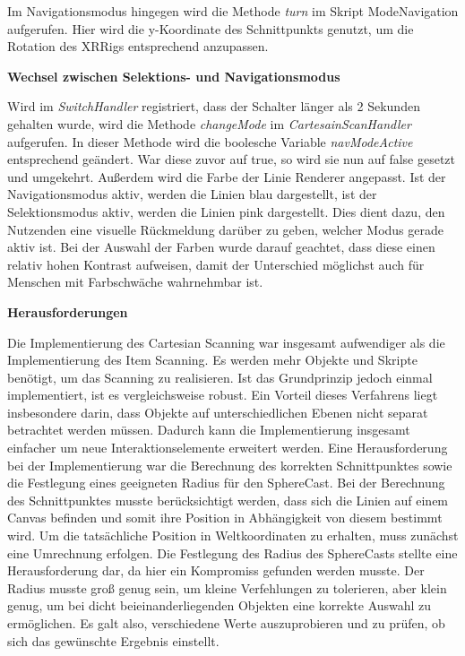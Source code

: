 Im Navigationsmodus hingegen wird die Methode \textit{turn} im Skript ModeNavigation aufgerufen. Hier wird die y-Koordinate des Schnittpunkts genutzt, um die Rotation des XRRigs entsprechend anzupassen.

\textbf{Wechsel zwischen Selektions- und Navigationsmodus}

Wird im \textit{SwitchHandler} registriert, dass der Schalter länger als 2 Sekunden gehalten wurde, wird die Methode \textit{changeMode} im \textit{CartesainScanHandler} aufgerufen. In dieser Methode wird die boolesche Variable \textit{navModeActive} entsprechend geändert. War diese zuvor auf true, so wird sie nun auf false gesetzt und umgekehrt. Außerdem wird die Farbe der Linie Renderer angepasst. Ist der Navigationsmodus aktiv, werden die Linien blau dargestellt, ist der Selektionsmodus aktiv, werden die Linien pink dargestellt. Dies dient dazu, den Nutzenden eine visuelle Rückmeldung darüber zu geben, welcher Modus gerade aktiv ist. Bei der Auswahl der Farben wurde darauf geachtet, dass diese einen relativ hohen Kontrast aufweisen, damit der Unterschied möglichst auch für Menschen mit Farbschwäche wahrnehmbar ist. 

\textbf{Herausforderungen}

Die Implementierung des Cartesian Scanning war insgesamt aufwendiger als die Implementierung des Item Scanning. Es werden mehr Objekte und Skripte benötigt, um das Scanning zu realisieren. Ist das Grundprinzip jedoch einmal implementiert, ist es vergleichsweise robust. Ein Vorteil dieses Verfahrens liegt insbesondere darin, dass Objekte auf unterschiedlichen Ebenen nicht separat betrachtet werden müssen. Dadurch kann die Implementierung insgesamt einfacher um neue Interaktionselemente erweitert werden. 
Eine Herausforderung bei der Implementierung war die Berechnung des korrekten Schnittpunktes sowie die Festlegung eines geeigneten Radius für den SphereCast. Bei der Berechnung des Schnittpunktes musste berücksichtigt werden, dass sich die Linien auf einem Canvas befinden und somit ihre Position in Abhängigkeit von diesem bestimmt wird. Um die tatsächliche Position in Weltkoordinaten zu erhalten, muss zunächst eine Umrechnung erfolgen. Die Festlegung des Radius des SphereCasts stellte eine Herausforderung dar, da hier ein Kompromiss gefunden werden musste. Der Radius musste groß genug sein, um kleine Verfehlungen zu tolerieren, aber klein genug, um bei dicht beieinanderliegenden Objekten eine korrekte Auswahl zu ermöglichen. Es galt also, verschiedene Werte auszuprobieren und zu prüfen, ob sich das gewünschte Ergebnis einstellt. 

